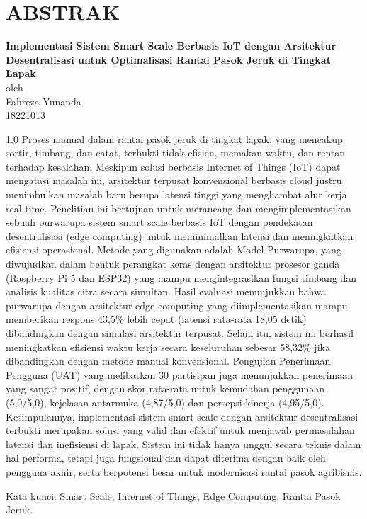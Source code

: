 \chapter*{ABSTRAK}

\begin{center}

    \textbf{Implementasi Sistem Smart Scale Berbasis IoT dengan Arsitektur Desentralisasi untuk Optimalisasi Rantai Pasok Jeruk di Tingkat Lapak} \\
    \vspace{0.4cm}
    oleh \\
    \vspace{0.4cm}
    Fahreza Yunanda\\
    18221013\\
\end{center}


\begin{spacing}{1.0}
Proses manual dalam rantai pasok jeruk di tingkat lapak, yang mencakup sortir,
timbang, dan catat, terbukti tidak efisien, memakan waktu, dan rentan terhadap
kesalahan. Meskipun solusi berbasis Internet of Things (IoT) dapat mengatasi
masalah ini, arsitektur terpusat konvensional berbasis cloud justru menimbulkan
masalah baru berupa latensi tinggi yang menghambat alur kerja real-time.
Penelitian ini bertujuan untuk merancang dan mengimplementasikan sebuah
purwarupa sistem smart scale berbasis IoT dengan pendekatan desentralisasi (edge
computing) untuk meminimalkan latensi dan meningkatkan efisiensi operasional.
Metode yang digunakan adalah Model Purwarupa, yang diwujudkan dalam bentuk
perangkat keras dengan arsitektur prosesor ganda (Raspberry Pi 5 dan ESP32) yang
mampu mengintegrasikan fungsi timbang dan analisis kualitas citra secara
simultan. Hasil evaluasi menunjukkan bahwa purwarupa dengan arsitektur edge
computing yang diimplementasikan mampu memberikan respons 43,5\% lebih cepat
(latensi rata-rata 18,05 detik) dibandingkan dengan simulasi arsitektur terpusat.
Selain itu, sistem ini berhasil meningkatkan efisiensi waktu kerja secara
keseluruhan sebesar 58,32\% jika dibandingkan dengan metode manual
konvensional. Pengujian Penerimaan Pengguna (UAT) yang melibatkan 30
partisipan juga menunjukkan penerimaan yang sangat positif, dengan skor rata-rata
untuk kemudahan penggunaan (5,0/5,0), kejelasan antarmuka (4,87/5,0) dan
persepsi kinerja (4,95/5,0). Kesimpulannya, implementasi sistem smart scale
dengan arsitektur desentralisasi terbukti merupakan solusi yang valid dan efektif
untuk menjawab permasalahan latensi dan inefisiensi di lapak. Sistem ini tidak
hanya unggul secara teknis dalam hal performa, tetapi juga fungsional dan dapat
diterima dengan baik oleh pengguna akhir, serta berpotensi besar untuk modernisasi
rantai pasok agribisnis.

Kata kunci: Smart Scale, Internet of Things, Edge Computing, Rantai Pasok Jeruk.
\end{spacing}


